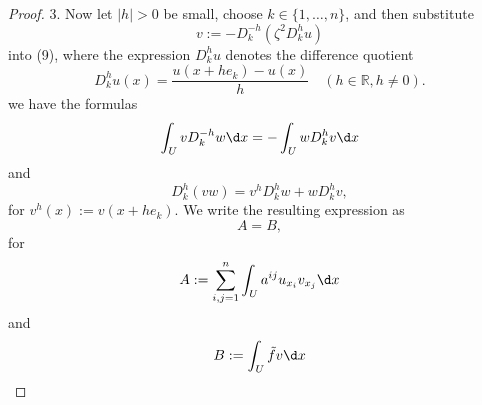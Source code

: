 \begin{theorem}
\begin{proof}
        3. Now let $|h|>0$ be small, choose $k \in\{1, \ldots, n\}$, and then substitute
        \begin{equation*}
            v:=-D_k^{-h}\left(\zeta^2 D_k^h u\right)
        \end{equation*}
        into (9), where the expression $D_k^h u$ denotes the difference quotient
        \begin{equation*}
            D_k^h u(x)
            =
            \frac{u\left(x+h e_k\right)-u(x)}{h} \quad(h \in \mathbb{R}, h \neq 0) .
        \end{equation*}
        we have the formulas
        \begin{equation*}
            \int_U v D_k^{-h} w \d x=-\int_U w D_k^h v \d x
        \end{equation*}
        and
        \begin{equation*}
            D_k^h(v w)=v^h D_k^h w+w D_k^h v,
        \end{equation*}
        for $v^h(x):=v\left(x+h e_k\right)$.
        We write the resulting expression as
        \begin{equation*}
            A=B,
        \end{equation*}
        for
        \begin{equation*}
            A:=\sum_{i, j=1}^n \int_U a^{i j} u_{x_i} v_{x_j} \d x
        \end{equation*}
        and
        \begin{equation*}
            B:=\int_U \tilde{f} v \d x
        \end{equation*}


\end{proof}
\end{theorem}
